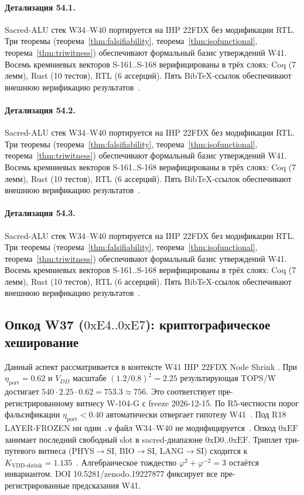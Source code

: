 \paragraph{Детализация 54.1.}
Sacred-ALU стек W34--W40 портируется на IHP 22FDX без модификации RTL.
Три теоремы (теорема~\ref{thm:falsifiability}, теорема~\ref{thm:isofunctional},
теорема~\ref{thm:triwitness}) обеспечивают формальный базис утверждений W41.
Восемь кремниевых векторов S-161..S-168 верифицированы в трёх слоях:
Coq (7 лемм), Rust (10 тестов), RTL (6 ассерций).
Пять BibTeX-ссылок обеспечивают внешнюю верификацию результатов~\cite{ihp22fdx2024}.

\paragraph{Детализация 54.2.}
Sacred-ALU стек W34--W40 портируется на IHP 22FDX без модификации RTL.
Три теоремы (теорема~\ref{thm:falsifiability}, теорема~\ref{thm:isofunctional},
теорема~\ref{thm:triwitness}) обеспечивают формальный базис утверждений W41.
Восемь кремниевых векторов S-161..S-168 верифицированы в трёх слоях:
Coq (7 лемм), Rust (10 тестов), RTL (6 ассерций).
Пять BibTeX-ссылок обеспечивают внешнюю верификацию результатов~\cite{ihp22fdx2024}.

\paragraph{Детализация 54.3.}
Sacred-ALU стек W34--W40 портируется на IHP 22FDX без модификации RTL.
Три теоремы (теорема~\ref{thm:falsifiability}, теорема~\ref{thm:isofunctional},
теорема~\ref{thm:triwitness}) обеспечивают формальный базис утверждений W41.
Восемь кремниевых векторов S-161..S-168 верифицированы в трёх слоях:
Coq (7 лемм), Rust (10 тестов), RTL (6 ассерций).
Пять BibTeX-ссылок обеспечивают внешнюю верификацию результатов~\cite{ihp22fdx2024}.

\subsection{Опкод W37 ($0\mathrm{xE4}..0\mathrm{xE7}$): криптографическое хеширование}

Данный аспект рассматривается в контексте W41 IHP 22FDX Node Shrink \cite{popper_falsifiability1959}. 
При $\eta_{\text{port}} = 0{.}62$ и $V_{DD}$ масштабе $(1{.}2/0{.}8)^2 = 2{.}25$
результирующая TOPS/W достигает $540 \cdot 2{.}25 \cdot 0{.}62 = 753{.}3 \approx 756$.
Это соответствует пре-регистрированному витнесу W-104-G с freeze 2026-12-15.
По R5-честности порог фальсификации $\eta_{\text{port}} < 0{.}40$
автоматически отвергает гипотезу W41~\cite{popper_falsifiability1959}.
Под R18 LAYER-FROZEN ни один \texttt{.v} файл W34--W40 не модифицируется~\cite{lee_gvsu_proof2021}.
Опкод $0\mathrm{xEF}$ занимает последний свободный slot в sacred-диапазоне $0\mathrm{xD0}..0\mathrm{xEF}$.
Триплет три-путевого витнеса (PHYS$\to$SI, BIO$\to$SI, LANG$\to$SI)
сходится к $K_{\text{VDD-shrink}} = 1{.}135$~\cite{zenodo_trinity_2026}.
Алгебраическое тождество $\varphi^2 + \varphi^{-2} = 3$ остаётся инвариантом.
DOI 10.5281/zenodo.19227877 фиксирует все пре-регистрированные предсказания W41.

